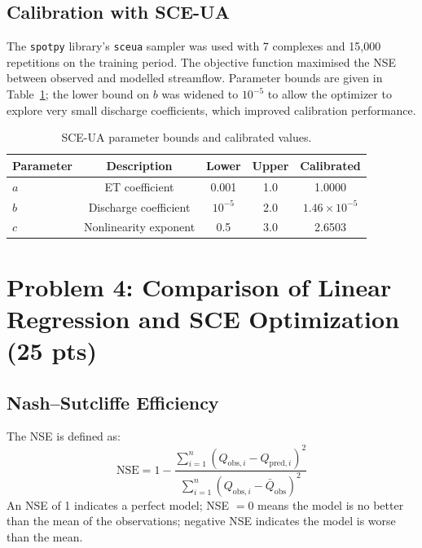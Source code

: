 \documentclass[11pt,letterpaper]{article}
\begin{document}
\subsection{Calibration with SCE-UA}

The \texttt{spotpy} library's \texttt{sceua} sampler was used with 7 complexes and 15{,}000 repetitions on the training period. The objective function maximised the NSE between observed and modelled streamflow. Parameter bounds are given in Table~\ref{tab:params}; the lower bound on $b$ was widened to $10^{-5}$ to allow the optimizer to explore very small discharge coefficients, which improved calibration performance.

\begin{table}[H]
\centering
\caption{SCE-UA parameter bounds and calibrated values.}
\label{tab:params}
\begin{tabular}{lcccc}
\toprule
\textbf{Parameter} & \textbf{Description} & \textbf{Lower} & \textbf{Upper} & \textbf{Calibrated} \\
\midrule
$a$ & ET coefficient          & 0.001   & 1.0 & 1.0000 \\
$b$ & Discharge coefficient   & $10^{-5}$ & 2.0 & $1.46\times10^{-5}$ \\
$c$ & Nonlinearity exponent   & 0.5     & 3.0 & 2.6503 \\
\bottomrule
\end{tabular}
\end{table}

\clearpage
\section{Problem 4: Comparison of Linear Regression and SCE Optimization (25 pts)}

\subsection{Nash--Sutcliffe Efficiency}

The NSE is defined as:
\begin{equation}
    \mathrm{NSE} = 1 - \frac{\sum_{i=1}^{n}(Q_{\mathrm{obs},i} - Q_{\mathrm{pred},i})^{2}}
                             {\sum_{i=1}^{n}(Q_{\mathrm{obs},i} - \bar{Q}_{\mathrm{obs}})^{2}}
\end{equation}
An NSE of 1 indicates a perfect model; NSE $= 0$ means the model is no better than the mean of the observations; negative NSE indicates the model is worse than the mean.
\end{document}
